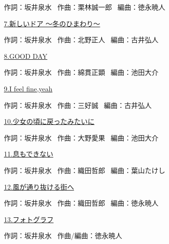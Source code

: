 \tiny{作詞：坂井泉水 \ 作曲：栗林誠一郎  \ 編曲：徳永暁人}

\small{\hyperlink{8_6}{7.新しいドア ～冬のひまわり～}}

\tiny{作詞：坂井泉水 \ 作曲：北野正人  \ 編曲：古井弘人}

\small{\hyperlink{8_7}{8.GOOD DAY}}

\tiny{作詞：坂井泉水 \ 作曲：綿貫正顕  \ 編曲：池田大介}

\small{\hyperlink{8_8}{9.I feel fine,yeah}}

\tiny{作詞：坂井泉水 \ 作曲：三好誠  \ 編曲：古井弘人}

\small{\hyperlink{8_9}{10.少女の頃に戻ったみたいに}}

\tiny{作詞：坂井泉水 \ 作曲：大野愛果  \ 編曲：池田大介}

\small{\hyperlink{8_10}{11.息もできない}}

\tiny{作詞：坂井泉水 \ 作曲：織田哲郎  \ 編曲：葉山たけし}

\small{\hyperlink{8_11}{12.風が通り抜ける街へ}}

\tiny{作詞：坂井泉水 \ 作曲：織田哲郎  \ 編曲：徳永暁人}

\small{\hyperlink{8_12}{13.フォトグラフ}}

\tiny{作詞：坂井泉水 \ 作曲/編曲：徳永暁人}

\clearpage
